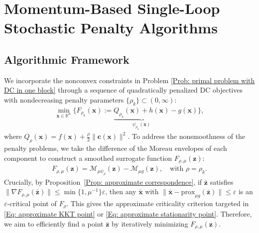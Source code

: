 \documentclass{article}
\theoremstyle{plain}
\theoremstyle{definition}
\theoremstyle{remark}
\newcommand{\RR}{\mathbb{R}}
\newcommand{\prox}{\mathrm{prox}}
\newcommand{\bx}{\bm{x}}
\newcommand{\bc}{\bm{c}}
\newcommand{\bz}{\bm{z}}
\newcommand{\calM}{\mathcal{M}}
\numberwithin{equation}{section}
\begin{document}
\section{Momentum-Based Single-Loop Stochastic Penalty Algorithms}
\label{sec:algorithm}
\label{Section: algorithms and main complexity results}
\subsection{Algorithmic Framework}
\label{Subsection: Algorithmic Framework}
We incorporate the nonconvex constraints in Problem \eqref{Prob: primal problem with DC in one block} through a sequence of quadratically penalized DC objectives with nondecreasing penalty parameters $\{\rho_k\}\subset(0,\infty)$:
\begin{align}
\label{Eq: the quadratic penalty problem}
\min_{\bx \in \RR^n} \big\{ F_{\rho_k}(\bx) := \underbrace{Q_{\rho_k}(\bx) + h(\bx)}_{\psi_{\rho_k}(\bx)} - g(\bx) \big\},
\end{align}
where $Q_{\rho}(\bx) = f(\bx) + \frac{\rho}{2} \|\bc(\bx)\|^2$. To address the nonsmoothness of the penalty problems, we take the difference of the Moreau envelopes of each component to construct a smoothed surrogate function $F_{\rho,\mu}(\bz)$:
\begin{align}
\label{Eq: the DME smoothing surrogates for penalty function}
F_{\rho,\mu}(\bz) = \calM_{\mu \psi_{\rho}}(\bz) - \calM_{\mu g}(\bz), \quad \text{with } \rho = \rho_k.
\end{align}
Crucially, by Proposition~\ref{Prop: approximate correspondence}, if $\bar{\bz}$ satisfies $\|\nabla F_{\rho,\mu}(\bar{\bz})\| \leq \min\{1, \mu^{-1}\} \varepsilon$, then any $\bar{\bx}$ with $\|\bar{\bx} - \prox_{\mu g}(\bar{\bz})\| \leq \varepsilon$ is an $\varepsilon$-critical point of $F_\rho$. 
This gives the approximate criticality criterion targeted in \eqref{Eq: approximate KKT point} or \eqref{Eq: approximate stationarity point}. Therefore, we aim to efficiently find a point $\bar{\bz}$ by iteratively minimizing $F_{\rho,\mu}(\bz)$.
\end{document}
